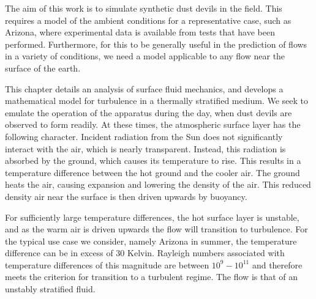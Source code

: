 \label{sec:mathmodel}


%
%

The aim of this work is to simulate synthetic
dust devils in the field. This requires a model of the ambient
conditions for a representative case, such as Arizona, where
experimental data is available from tests that have been
performed. Furthermore, for this to be generally useful in the
prediction of flows in a variety of conditions, we need a model
applicable to any flow near the surface of the earth.  

This chapter details an analysis of surface fluid mechanics, and
develops a mathematical model for turbulence in a thermally stratified
medium. We seek to emulate the operation of the apparatus during the
day, when dust devils are observed to form readily. 
At these times, the atmospheric surface layer has the following
character. Incident radiation from the Sun does not significantly
interact with the air, which is nearly
transparent\cite{haltiner1957dynamical}. Instead, this radiation is
absorbed by the ground, which causes its temperature to rise. This
results in a temperature difference between the hot ground and the cooler
air. The ground heats the air, causing expansion and lowering the density
of the air. This reduced density air near the surface is then driven
upwards by buoyancy.    

For sufficiently large temperature differences, the hot surface layer is
unstable, and as the warm air is driven upwards the flow will transition
to turbulence. For the typical use case we consider, namely Arizona in
summer, the temperature difference can be in excess of 30 Kelvin. 
Rayleigh numbers associated with temperature differences of this
magnitude are between $10^{9} - 10^{11}$ and therefore meets the
criterion\cite{incropera1996fundamentals}  
for transition to a turbulent regime. The flow is that of an unstably
stratified fluid.  

